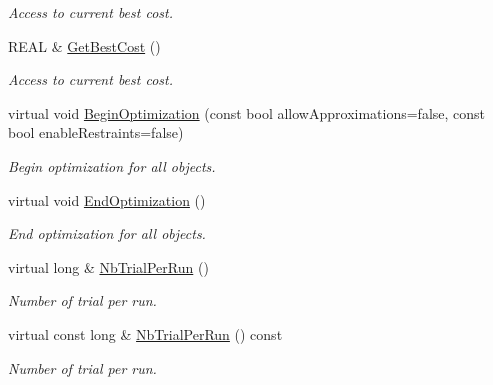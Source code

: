 \begin{DoxyCompactItemize}
\begin{DoxyCompactList}\small\item\em Access to current best cost. \end{DoxyCompactList}\item 
\mbox{\label{class_obj_cryst_1_1_optimization_obj_a30885bd0f6b1453d69215a26bd9a236e}} 
R\+E\+AL \& \mbox{\hyperlink{class_obj_cryst_1_1_optimization_obj_a30885bd0f6b1453d69215a26bd9a236e}{Get\+Best\+Cost}} ()
\begin{DoxyCompactList}\small\item\em Access to current best cost. \end{DoxyCompactList}\item 
\mbox{\label{class_obj_cryst_1_1_optimization_obj_ad9b5fa7b84c5dea5fa62ccb7dfd5dd4a}} 
virtual void \mbox{\hyperlink{class_obj_cryst_1_1_optimization_obj_ad9b5fa7b84c5dea5fa62ccb7dfd5dd4a}{Begin\+Optimization}} (const bool allow\+Approximations=false, const bool enable\+Restraints=false)
\begin{DoxyCompactList}\small\item\em Begin optimization for all objects. \end{DoxyCompactList}\item 
\mbox{\label{class_obj_cryst_1_1_optimization_obj_a3fca9243772553a2e9bbadab859c6816}} 
virtual void \mbox{\hyperlink{class_obj_cryst_1_1_optimization_obj_a3fca9243772553a2e9bbadab859c6816}{End\+Optimization}} ()
\begin{DoxyCompactList}\small\item\em End optimization for all objects. \end{DoxyCompactList}\item 
\mbox{\label{class_obj_cryst_1_1_optimization_obj_abce28f5f2b98dce089aad6933a3f3c3c}} 
virtual long \& \mbox{\hyperlink{class_obj_cryst_1_1_optimization_obj_abce28f5f2b98dce089aad6933a3f3c3c}{Nb\+Trial\+Per\+Run}} ()
\begin{DoxyCompactList}\small\item\em Number of trial per run. \end{DoxyCompactList}\item 
\mbox{\label{class_obj_cryst_1_1_optimization_obj_a696a0018bf7bee658e409f761c197c0e}} 
virtual const long \& \mbox{\hyperlink{class_obj_cryst_1_1_optimization_obj_a696a0018bf7bee658e409f761c197c0e}{Nb\+Trial\+Per\+Run}} () const
\begin{DoxyCompactList}\small\item\em Number of trial per run. \end{DoxyCompactList}\end{DoxyCompactItemize}
